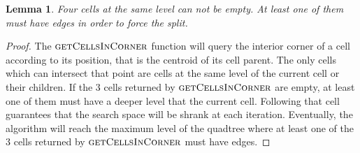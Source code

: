 \documentclass{article}
\newtheorem*{lemma}{Lemma}
\begin{document}
    \begin{lemma}
    Four cells at the same level can not be empty.  At least one of them must have edges in order to force the split.
    \end{lemma}
    
    \begin{proof}
    The $\textsc{getCellsInCorner}$ function will query the interior corner of a cell according to its position, that is the centroid of its cell parent.  The only cells which can intersect that point are cells at the same level of the current cell or their children.  If the 3 cells returned by $\textsc{getCellsInCorner}$ are empty, at least one of them must have a deeper level that the current cell.  Following that cell guarantees that the search space will be shrank at each iteration.  Eventually, the algorithm will reach the maximum level of the quadtree where at least one of the 3 cells returned by $\textsc{getCellsInCorner}$ must have edges.
    \end{proof}
    
\end{document}
